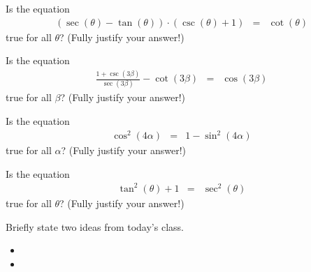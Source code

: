 \begin{problem}
\item Is the equation
  \begin{eqnarray*}
    \left( \sec(\theta) - \tan(\theta) \right) \cdot \left(\csc(\theta)+1\right)
    & = &
    \cot(\theta)
  \end{eqnarray*}
  true for all $\theta$? (Fully justify your answer!)

  \vfill

  \clearpage

\item Is the equation
  \begin{eqnarray*}
    \frac{1+\csc(3\beta)}{\sec(3\beta)} - \cot(3\beta) & = & \cos(3\beta)
  \end{eqnarray*}
  true for all $\beta$? (Fully justify your answer!)

  \vfill

  \clearpage

\item Is the equation
  \begin{eqnarray*}
    \cos^2(4\alpha) & = & 1 - \sin^2(4\alpha)
  \end{eqnarray*}
  true for all $\alpha$? (Fully justify your answer!)

  \vfill

  \clearpage

\item Is the equation
  \begin{eqnarray*}
    \tan^2(\theta) + 1 & = & \sec^2(\theta)
  \end{eqnarray*}
  true for all $\theta$? (Fully justify your answer!)

  \vfill

  \clearpage

\end{problem}

\postClass

\begin{problem}
\item Briefly state two ideas from today's class.
  \begin{itemize}
  \item
  \item
  \end{itemize}
\item
  \begin{subproblem}
    \item
  \end{subproblem}
\end{problem}


